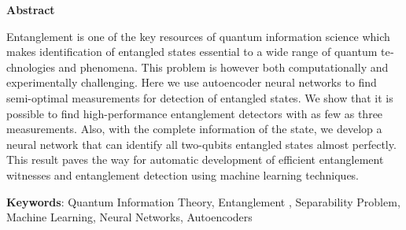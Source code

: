 \thispagestyle{empty}
\begin{latin} %
%
\centerline{\textbf{\large{Abstract}}}
\vskip 1cm
\noindent

Entanglement is one of the key resources of quantum information science which makes identification of entangled states essential to a wide range of quantum technologies and phenomena.
This problem is however both computationally and experimentally challenging.
Here we use autoencoder neural networks to find semi-optimal measurements for detection of entangled states. We show that it is possible to find high-performance entanglement detectors with as few as three measurements. Also, with the complete information of the state, we develop a neural network that can identify all two-qubits entangled states almost perfectly.
This result paves the way for automatic development of efficient entanglement witnesses  and  entanglement detection using machine learning techniques.

\vspace{1cm}
\textbf{Keywords}: Quantum Information Theory, Entanglement , Separability Problem, Machine Learning, Neural Networks, Autoencoders

\end{latin}
